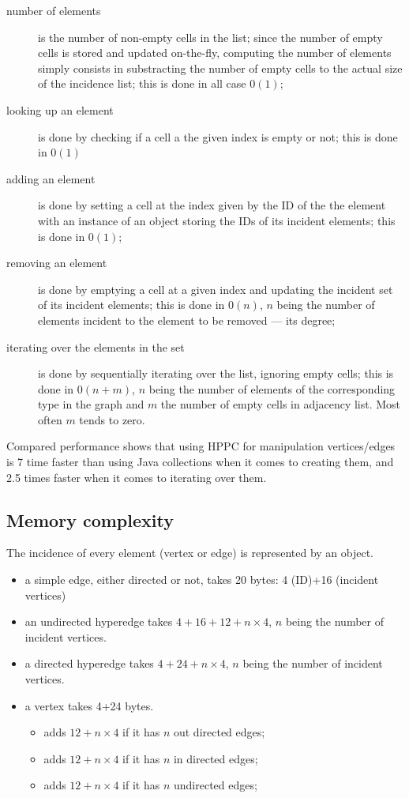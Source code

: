 \documentclass{article}
\begin{document}
\begin{description}
  \item[number of elements] is the number of non-empty cells in the list; since the number of empty cells is stored and
  updated on-the-fly, computing the number of elements simply consists in substracting the number of empty cells to the
  actual size of the incidence list; this is done in all case $0(1)$;
  \item[looking up an element] is done by checking if a cell a the given index is empty or not; this is done in $0(1)$
	\item[adding an element] is done by setting a cell at the index given by the ID of the the element with an instance of an object storing the IDs of its incident elements; this is done in $0(1)$;
  \item[removing an element] is done by emptying a cell at a given index and updating the incident set of its incident elements; this
  is done in $0(n)$, $n$ being the number of elements incident to the  element to be removed --- its degree;
  \item[iterating over the elements in the set] is done by sequentially iterating over the list, ignoring empty cells; this is done
  in $0(n + m)$, $n$ being the number of elements of the corresponding type in the graph and $m$ the number of empty cells in
  adjacency list. Most often $m$ tends to zero.
\end{description} 

Compared performance shows that using HPPC for manipulation vertices/edges is 7 time faster than using Java collections when
it comes to creating them, and 2.5 times faster when it comes to iterating over them.



\subsection{Memory complexity}

The incidence of every element (vertex or edge) is represented by an object.
\begin{itemize}
  \item a simple edge, either directed or not, takes 20 bytes: 4 (ID)+16 (incident vertices)
\item  an undirected hyperedge takes $4+16+12+n\times 4$, $n$ being the number of incident vertices.  
\item  a directed hyperedge takes $4+24+n\times 4$, $n$ being the number of incident vertices.  
\item a vertex takes 4+24 bytes.
	\begin{itemize}
	\item adds $12 + n\times 4$ if it has $n$ out directed edges;  
	\item adds $12 + n\times 4$ if it has $n$ in directed edges;  
	\item adds $12 + n\times 4$ if it has $n$ undirected edges;  
	\end{itemize}
\end{itemize}
\end{document}
